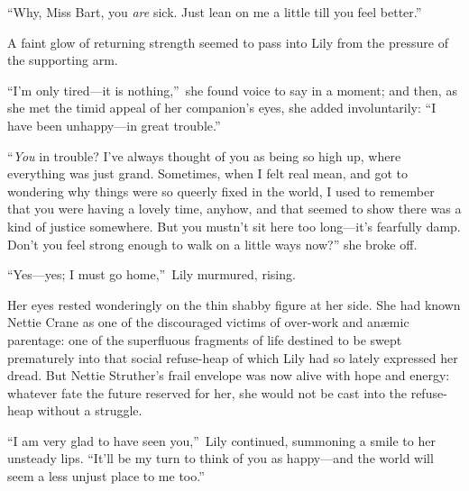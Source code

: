 \documentclass[12pt,a4paper]{book}
\begin{document}
``Why, Miss Bart, you \textit{are} sick. Just lean on me a little till you
feel better.''





A faint glow of returning strength seemed to pass into Lily from
the pressure of the supporting arm.





``I'm only tired---it is nothing,''\ she found voice to say in a
moment; and then, as she met the timid appeal of her companion's
eyes, she added involuntarily: ``I have been unhappy---in great
trouble.''





``\textit{You} in trouble? I've always thought of you as being so high up,
where everything was just grand. Sometimes, when I felt real
mean, and got to wondering why things were so queerly fixed in
the world, I used to remember that you were having a lovely time,
anyhow, and that seemed to show there was a kind of justice
somewhere. But you mustn't sit here too long---it's fearfully
damp. Don't you feel strong enough to walk on a little ways now?''
she broke off.





``Yes---yes; I must go home,''\ Lily murmured, rising.





Her eyes rested wonderingly on the thin shabby figure at her
side. She had known Nettie Crane as one of the discouraged
victims of over-work and an{\ae}mic parentage: one of the
superfluous fragments of life destined to be swept prematurely
into that social refuse-heap of which Lily had so lately
expressed her dread. But Nettie Struther's frail envelope was now
alive with hope and energy: whatever fate the future reserved for
her, she would not be cast into the refuse-heap without a
struggle.





``I am very glad to have seen you,''\ Lily continued, summoning a
smile to her unsteady lips. ``It'll be my turn to think of you as
happy---and the world will seem a less unjust place to me too.''
\end{document}
